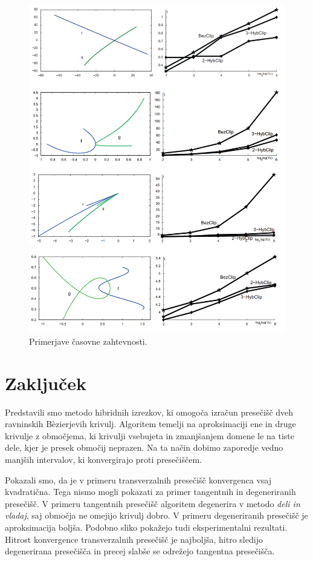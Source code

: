 \documentclass[12pt,a4paper, reqno]{amsart}
\begin{document}
\begin{figure}[!h]
  \begin{center}
    \includegraphics[width=0.9\linewidth]{primeri}
  \caption{Primerjave časovne zahtevnosti.}
  \label{fig:primeri}
  \end{center}
  
\end{figure}

\section{Zaključek}
Predstavili smo metodo hibridnih izrezkov, ki omogoča izračun presečišč dveh ravninskih B\`{e}zierjevih krivulj. Algoritem temelji na aproksimaciji ene in druge krivulje z območjema, ki krivulji vsebujeta in zmanjšanjem domene le na tiste dele, kjer je presek območij neprazen. Na ta način dobimo zaporedje vedno manjših intervalov, ki konvergirajo proti presečiščem.

Pokazali smo, da je v primeru transverzalnih presečišč konvergenca vsaj kvadratična. Tega nismo mogli pokazati za primer tangentnih in degeneriranih presečišč. V primeru tangentnih presečišč algoritem degenerira v metodo {\em deli in vladaj}, saj območja ne omejijo krivulj dobro. V primeru degeneriranih presečišč je aproksimacija boljša.
Podobno sliko pokažejo tudi eksperimentalni rezultati. Hitrost konvergence transverzalnih presečišč je najboljša, hitro sledijo degenerirana presečišča in precej slabše se odrežejo tangentna presečišča.
\end{document}

